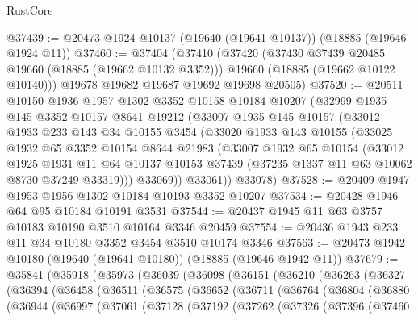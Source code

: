 \begin{lexlean}{RustCore}
\begin{coremodule}
@37439 := @20473 @1924 @10137 (@19640 (@19641 @10137)) (@18885 (@19646 @1924 @11))
@37460 := @37404
    (@37410
      (@37420
        (@37430 @37439 @20485 @19660 (@18885 (@19662 @10132 @3352)))
        @19660
        (@18885 (@19662 @10122 @10140)))
      @19678
      @19682
      @19687
      @19692
      @19698
      @20505)
@37520 := @20511
    @10150
    @1936
    @1957
    @1302
    @3352
    @10158
    @10184
    @10207
    (@32999
      @1935
      @145
      @3352
      @10157
      @8641
      @19212
      (@33007
        @1935
        @145
        @10157
        (@33012
          @1933
          @233
          @143
          @34
          @10155
          @3454
          (@33020
            @1933
            @143
            @10155
            (@33025
              @1932
              @65
              @3352
              @10154
              @8644
              @21983
              (@33007
                @1932
                @65
                @10154
                (@33012
                  @1925
                  @1931
                  @11
                  @64
                  @10137
                  @10153
                  @37439
                  (@37235 @1337 @11 @63 @10062 @8730 @37249 @33319)))
              @33069))
          @33061))
      @33078)
@37528 := @20409 @1947 @1953 @1956 @1302 @10184 @10193 @3352 @10207
@37534 := @20428 @1946 @64 @95 @10184 @10191 @3531
@37544 := @20437 @1945 @11 @63 @3757 @10183 @10190 @3510 @10164 @3346 @20459
@37554 := @20436 @1943 @233 @11 @34 @10180 @3352 @3454 @3510 @10174 @3346
@37563 := @20473 @1942 @10180 (@19640 (@19641 @10180)) (@18885 (@19646 @1942 @11))
@37679 := @35841
    (@35918
      (@35973
        (@36039
          (@36098
            (@36151
              (@36210
                (@36263
                  (@36327
                    (@36394
                      (@36458
                        (@36511
                          (@36575
                            (@36652
                              (@36711
                                (@36764
                                  (@36804
                                    (@36880
                                      (@36944
                                        (@36997
                                          (@37061
                                            (@37128
                                              (@37192
                                                (@37262
                                                  (@37326
                                                    (@37396
                                                      (@37460

\end{coremodule}
\end{lexlean}
